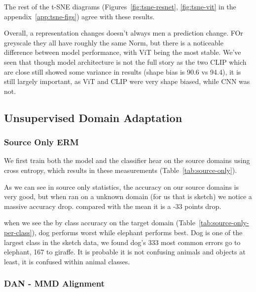 \documentclass{article}
\begin{document}
The rest of the t-SNE diagrams (Figures~\ref{fig:tsne-resnet}, \ref{fig:tsne-vit} in the appendix~\ref{app:tsne-figs}) agree with these results.

Overall, a representation changes doesn't always men a prediction change. FOr greyscale they all have roughly the same Norm, but there is a noticeable difference between model performance, with ViT being the most stable.
We've seen that though model architecture is not the full story  as the two CLIP which are close still showed some variance in results (shape bias is 90.6 vs 94.4), it is still largely important, as ViT and CLIP were very shape biased, while CNN was not.

\subsection{Unsupervised Domain Adaptation}

\subsubsection{Source Only ERM}

We first train both the model and the classifier hear on the source domains using cross entropy, which results in these measurements (Table~\ref{tab:source-only}).


As we can see in source only statistics, the accuracy on our source domains is very good, but when ran on a unknown domain (for us that is sketch) we notice a massive accuracy drop.
compared with the mean it is a -33 points drop.


when we see the by class accuracy on the target domain (Table~\ref{tab:source-only-per-class}), dog performs worst while elephant performs best.
Dog is one of the largest class in the sketch data, we found dog's 333 most common errors go to elephant, 167 to giraffe. It is probable it is not confusing
animals and objects at least, it is confused within animal classes.

\subsubsection{DAN - MMD Alignment}

\end{document}
